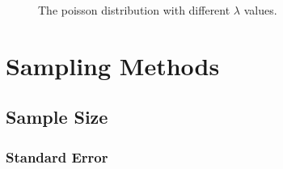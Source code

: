 \documentclass[
  a4paper,
]{scrbook}
\begin{document}
\begin{figure}[ht]


\caption{\label{fig-pois}The poisson distribution with different
\(\lambda\) values.}

\end{figure}%


\chapter{Sampling Methods}\label{sampling-methods}

\section{Sample Size}\label{sample-size}

\subsection{Standard Error}\label{standard-error}
\end{document}
